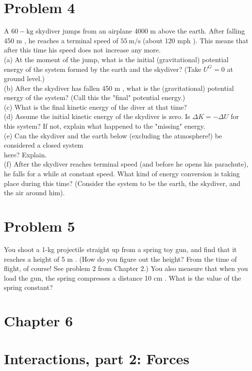 \documentclass[10pt]{article}
\begin{document}
\section*{Problem 4}
A $60-\mathrm{kg}$ skydiver jumps from an airplane 4000 m above the earth. After falling 450 m , he reaches a terminal speed of $55 \mathrm{~m} / \mathrm{s}$ (about 120 mph ). This means that after this time his speed does not increase any more.\\
(a) At the moment of the jump, what is the initial (gravitational) potential energy of the system formed by the earth and the skydiver? (Take $U^{G}=0$ at ground level.)\\
(b) After the skydiver has fallen 450 m , what is the (gravitational) potential energy of the system? (Call this the "final" potential energy.)\\
(c) What is the final kinetic energy of the diver at that time?\\
(d) Assume the initial kinetic energy of the skydiver is zero. Is $\Delta K=-\Delta U$ for this system? If not, explain what happened to the "missing" energy.\\
(e) Can the skydiver and the earth below (excluding the atmosphere!) be considered a closed system\\
here? Explain.\\
(f) After the skydiver reaches terminal speed (and before he opens his parachute), he falls for a while at constant speed. What kind of energy conversion is taking place during this time? (Consider the system to be the earth, the skydiver, and the air around him).

\section*{Problem 5}
You shoot a 1-kg projectile straight up from a spring toy gun, and find that it reaches a height of 5 m . (How do you figure out the height? From the time of flight, of course! See problem 2 from Chapter 2.) You also measure that when you load the gun, the spring compresses a distance 10 cm . What is the value of the spring constant?

\section*{Chapter 6}
\section*{Interactions, part 2: Forces}
\end{document}

